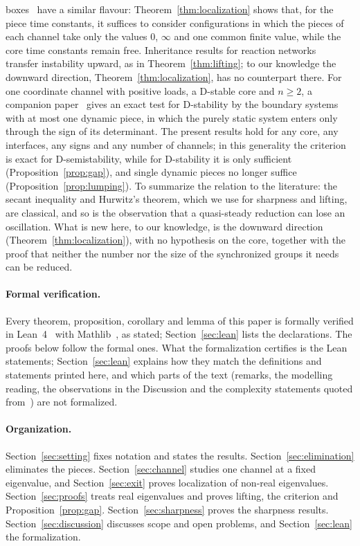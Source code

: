 \documentclass[11pt,a4paper]{article}
\theoremstyle{plain}
\theoremstyle{definition}
\theoremstyle{remark}
\begin{document}
boxes~\cite{blanchini2022} have a similar flavour: Theorem~\ref{thm:localization} shows
that, for the piece time constants, it suffices to consider configurations in which the
pieces of each channel take only the values $0$, $\infty$ and one common finite value,
while the core time constants remain free. Inheritance results for reaction
networks~\cite{banaji2018,vassena2024} transfer instability upward, as in
Theorem~\ref{thm:lifting}; to our knowledge the downward direction,
Theorem~\ref{thm:localization}, has no counterpart there. For one coordinate channel with
positive loads, a D-stable core and $n\ge2$, a companion paper~\cite{companionI2026} gives an
exact test for D-stability by the boundary systems with at most one dynamic piece, in which
the purely static system enters only through the sign of its determinant. The present
results hold for any core, any interfaces, any signs and any number of channels; in this
generality the criterion is exact for D-semistability, while for D-stability it is only
sufficient (Proposition~\ref{prop:gap}), and single dynamic pieces no longer suffice
(Proposition~\ref{prop:lumping}). To summarize the relation to the
literature: the secant inequality and Hurwitz's theorem, which we use for sharpness and
lifting, are classical, and so is the observation that a quasi-steady reduction can lose an
oscillation. What is new here, to our knowledge, is the downward direction
(Theorem~\ref{thm:localization}), with no hypothesis on the core, together with the proof that
neither the number nor the size of the synchronized groups it needs can be reduced.

\paragraph{Formal verification.} Every theorem, proposition, corollary and lemma of this
paper is formally verified in Lean~4~\cite{demoura2021} with Mathlib~\cite{mathlib2020}, as
stated; Section~\ref{sec:lean} lists the declarations. The proofs below follow the formal
ones. What the formalization certifies is the Lean statements; Section~\ref{sec:lean}
explains how they match the definitions and statements printed here, and which parts of the
text (remarks, the modelling reading, the observations in the Discussion and the complexity
statements quoted from~\cite{companionHard2026}) are not formalized.

\paragraph{Organization.} Section~\ref{sec:setting} fixes notation and states the results.
Section~\ref{sec:elimination} eliminates the pieces. Section~\ref{sec:channel} studies one
channel at a fixed eigenvalue, and Section~\ref{sec:exit} proves localization of non-real
eigenvalues. Section~\ref{sec:proofs} treats real eigenvalues and proves lifting, the
criterion and Proposition~\ref{prop:gap}. Section~\ref{sec:sharpness} proves the
sharpness results. Section~\ref{sec:discussion} discusses scope and open problems, and
Section~\ref{sec:lean} the formalization.
\end{document}
